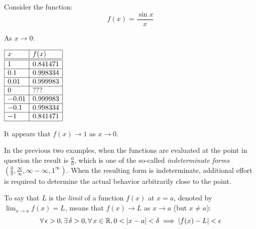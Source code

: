 \documentclass[letterpaper,12pt,fleqn]{article}
\newcommand{\e}{\epsilon}
\renewcommand{\d}{\delta}
\begin{document}
\begin{example}
  Consider the function:
  \[f(x)=\frac{\sin x}{x}\]

  \bigskip

  \begin{center}
  \end{center}

  As \(x\to0\):

  \begin{center}
    \(\begin{array}{|l|l|}
    \hline
    x & f(x) \\
    \hline
    \hline
    1 & 0.841471 \\
    \hline
    0.1 & 0.998334 \\
    \hline
    0.01 & 0.999983 \\
    \hline
    0 & ??? \\
    \hline
    -0.01 & 0.999983 \\
    \hline
    -0.1 & 0.998334 \\
    \hline
    -1 & 0.841471 \\
    \hline
    \end{array}\)
  \end{center}

  \bigskip

  It appears that \(f(x)\to1\) as \(x\to0\).
\end{example}

In the previous two examples, when the functions are evaluated at the point in question the result is
\(\frac{0}{0}\), which is one of the so-called \emph{indeterminate forms} \((\frac{0}{0},\frac{\infty}{\infty},
\infty-\infty,1^{\infty})\).  When the resulting form is indeterminate, additional effort is required to determine
the actual behavior arbitrarily close to the point.

\begin{definition}
  To say that \(L\) is the \emph{limit} of a function \(f(x)\) at \(x=a\), denoted by
  \(\displaystyle\lim_{x\to a}f(x)=L\), means that \(f(x)\to L\) as \(x\to a\) (but \(x\ne a\)):
  \[\forall\,\e>0,\exists\,\d>0,\forall\,x\in\R,0<\abs{x-a}<\d\implies\abs{f(x)-L}<\e\]
\end{definition}
\end{document}

